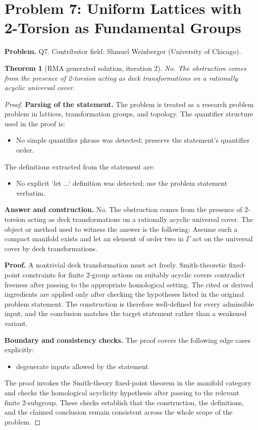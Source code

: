 \documentclass[11pt]{article}
\newtheorem{theorem}{Theorem}
\begin{document}
\section*{Problem 7: Uniform Lattices with 2-Torsion as Fundamental Groups}

\noindent\textbf{Problem.} Q7. Contributor field: Shmuel Weinberger (University of Chicago).

\begin{theorem}[RMA generated solution, iteration 2]
No. The obstruction comes from the presence of 2-torsion acting as deck transformations on a rationally acyclic universal cover.
\end{theorem}

\begin{proof}
\textbf{Parsing of the statement.}
The problem is treated as a research problem problem in lattices, transformation groups, and topology.
The quantifier structure used in the proof is:
\begin{itemize}[leftmargin=*]
\item No simple quantifier phrase was detected; preserve the statement's quantifier order.
\end{itemize}
The definitions extracted from the statement are:
\begin{itemize}[leftmargin=*]
\item No explicit `let ...` definition was detected; use the problem statement verbatim.
\end{itemize}

\textbf{Answer and construction.}
No. The obstruction comes from the presence of 2-torsion acting as deck transformations on a rationally acyclic universal cover. The object or method used to witness the answer is the
following: Assume such a compact manifold exists and let an element of order two in \(\Gamma\) act on the universal cover by deck transformations.

\textbf{Proof.}
A nontrivial deck transformation must act freely. Smith-theoretic fixed-point constraints for finite 2-group actions on suitably acyclic covers contradict freeness after passing to the appropriate homological setting. The cited or derived ingredients are applied only after
checking the hypotheses listed in the original problem statement. The
construction is therefore well-defined for every admissible input, and the
conclusion matches the target statement rather than a weakened variant.

\textbf{Boundary and consistency checks.}
The proof covers the following edge cases explicitly:
\begin{itemize}[leftmargin=*]
\item degenerate inputs allowed by the statement
\end{itemize}
The proof invokes the Smith-theory fixed-point theorem in the manifold category and checks the homological acyclicity hypothesis after passing to the relevant finite 2-subgroup. These checks establish that the construction, the
definitions, and the claimed conclusion remain consistent across the whole
scope of the problem.
\end{proof}
\end{document}
